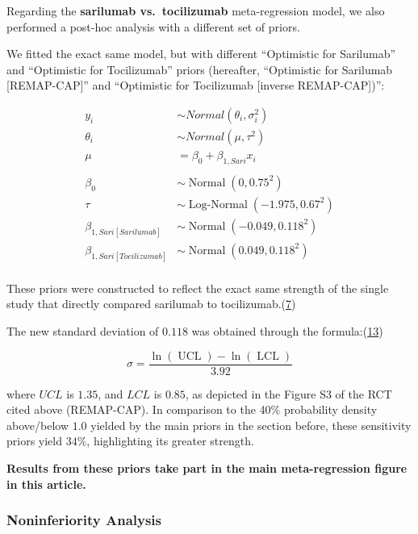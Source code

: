 \documentclass[
  12pt,
]{article}
\begin{document}
\newpage

Regarding the \textbf{sarilumab vs.~tocilizumab} meta-regression model,
we also performed a post-hoc analysis with a different set of priors.

We fitted the exact same model, but with different ``Optimistic for
Sarilumab'' and ``Optimistic for Tocilizumab'' priors (hereafter,
``Optimistic for Sarilumab {[}REMAP-CAP{]}'' and ``Optimistic for
Tocilizumab {[}inverse REMAP-CAP{]})'':

\begin{align*}
y_i & \sim Normal(\theta_i, \sigma_i^2) \tag{Likelihood}\\
\theta_i & \sim Normal(\mu, \tau^2)\\
\mu &= \beta_0 + \beta_{1, Sari} x_i\\
\\
\beta_0 & \sim \operatorname{Normal}(0, 0.75^2) \tag{Priors}\\
\tau & \sim \operatorname{Log-Normal}(-1.975, 0.67^2)\\
\beta_{1, Sari[Sarilumab]} & \sim \operatorname{Normal}(-0.049, 0.118^2)\\
\beta_{1, Sari[Tocilizumab]} & \sim \operatorname{Normal}(0.049, 0.118^2)\\
\end{align*}

These priors were constructed to reflect the exact same strength of the
single study that directly compared sarilumab to
tocilizumab.(\protect\hyperlink{ref-zotero-3144}{7})

The new standard deviation of \(0.118\) was obtained through the
formula:(\protect\hyperlink{ref-cochrane632}{13})

\[\sigma = \frac{\ln(\operatorname{UCL}) - \ln(\operatorname{LCL})}{3.92}\]

where \(UCL\) is \(1.35\), and \(LCL\) is \(0.85\), as depicted in the
Figure S3 of the RCT cited above (REMAP-CAP). In comparison to the 40\%
probability density above/below \(1.0\) yielded by the main priors in
the section before, these sensitivity priors yield \(34\%\),
highlighting its greater strength.

\textbf{Results from these priors take part in the main meta-regression
figure in this article.}

\newpage

\hypertarget{noninferiority-analysis}{%
\subsubsection{Noninferiority Analysis}\label{noninferiority-analysis}}
\end{document}

